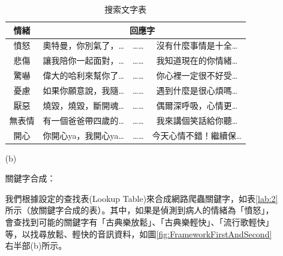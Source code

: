 \documentclass[12pt]{scrreprt}
\begin{document}
\begin{itemize}
\begin{itemize}
\begin{table}[h]
\caption{搜索文字表}
    \centering
\begin{tabular}{|*{4}{r|}}
\hline
\multicolumn{1}{|c|}{情緒}
& \multicolumn{3}{c|}{回應字} \\\hline
\multicolumn{1}{|c}{憤怒}&\multicolumn{1}{|c}{奧特曼，你別氣了，…}&\multicolumn{1}{|c}{……}&\multicolumn{1}{|c|}{沒有什麼事情是十全…} \\\hline
\multicolumn{1}{|c}{悲傷}&\multicolumn{1}{|c}{讓我陪你一起面對，…}&\multicolumn{1}{|c}{……}&\multicolumn{1}{|c|}{我知道現在的你情緒…} \\\hline
\multicolumn{1}{|c}{驚嚇}&\multicolumn{1}{|c}{偉大的哈利來幫你了…}&\multicolumn{1}{|c}{……}&\multicolumn{1}{|c|}{你心裡一定很不好受…}\\\hline
\multicolumn{1}{|c}{憂慮}&\multicolumn{1}{|c}{如果你願意說，我隨…}&\multicolumn{1}{|c}{……}&\multicolumn{1}{|c|}{遇到什麼是很心煩嗎…}\\\hline
\multicolumn{1}{|c}{厭惡}&\multicolumn{1}{|c}{燒毀，燒毀，斷開魂…}   &\multicolumn{1}{|c}{……}   &\multicolumn{1}{|c|}{偶爾深呼吸，心情更… }\\\hline
\multicolumn{1}{|c}{無表情}&\multicolumn{1}{|c}{有一個爸爸帶四歲的…}   &\multicolumn{1}{|c}{……}   &\multicolumn{1}{|c|}{我來講個笑話給你聽…}\\\hline
\multicolumn{1}{|c}{開心}&\multicolumn{1}{|c}{你開心ya，我開心ya…}   &\multicolumn{1}{|c}{……}   &\multicolumn{1}{|c|}{今天心情不錯！繼續保…}\\\hline
\end{tabular}
\label{lab:searchtext}
\end{table}

\item[(b)]{\begin{bfseries}{關鍵字合成：}\end{bfseries}}

我們根據設定的查找表(Lookup Table)來合成網路爬蟲關鍵字，如表\ref{lab:2}所示（放關鍵字合成的表）。其中，如果是偵測到病人的情緒為「憤怒」，會查找到可能的關鍵字有「古典樂放鬆」、「古典樂輕快」、「流行歌輕快」等，以找尋放鬆、輕快的音訊資料，如圖\ref{fig:FrameworkFirstAndSecond}右半部(b)所示。\\


\end{itemize}
\end{itemize}
\end{document}
